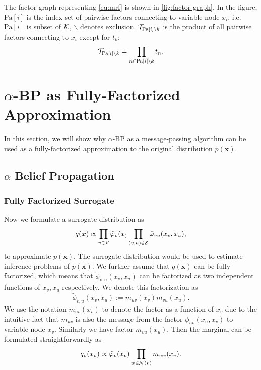 \documentclass[conference,onecolumn]{IEEEtran}
\begin{document}
The factor graph representing \autoref{eq:mrf} is shown in \autoref{fig:factor-graph}. In the figure, $\text{Pa}[i]$ is the index set of pairwise factors connecting to variable node $x_i$, i.e. $\text{Pa}[i]$ is subset of $\mathcal{K}$, $\backslash$ denotes exclusion. $\mathcal{T}_{\text{Pa}[i]\backslash k}$ is the product of all pairwise factors connecting to $x_i$ except for $t_k$:
\begin{equation}
  \mathcal{T}_{\text{Pa}[i]\backslash k} = \prod_{n \in \text{Pa}[i]\backslash k}t_n.
\end{equation}




\section{$\alpha$-BP as Fully-Factorized Approximation}
In this section, we will show why $\alpha$-BP as a message-passing algorithm can be used as a fully-factorized approximation to the original distribution $p(\bm{x})$. 




\subsection{$\alpha$ Belief Propagation}
\subsubsection{Fully Factorized Surrogate}
Now we formulate a surrogate distribution as
\begin{equation}
    q(\bm{x}) \propto \prod_{{v\in \mathcal{V}}} \tilde{\varphi}_v(x_) \prod_{(v,u) \in \mathcal{E}} \tilde{\varphi}_{vu}(x_v, x_u),
\end{equation}
to approximate $p(\bm{x})$. The surrogate distribution would be used to estimate inference problems of $p(\bm{x})$. We further assume that $q(\bm{x})$ can be fully factorized, which means that $\tilde{\phi}_{v,u}(x_v, x_u)$ can be factorized as two independent functions of $x_v, x_u$ respectively. We denote this factorization as
\begin{equation}
  \tilde{\phi}_{v,u}(x_v, x_u) := m_{uv}(x_v) m_{vu}(x_u).
\end{equation}
We use the notation $m_{uv}(x_v)$ to denote the factor as a function of $x_v$ due to the intuitive fact that $m_{uv}$ is also the message from the factor $\phi_{uv}(x_u, x_v)$ to variable node $x_v$. Similarly we have factor $m_{vu}(x_u)$. Then the marginal can be formulated straightforwardly as
\begin{equation}
  q_v(x_v) \propto \tilde{\varphi}_v(x_v) \prod_{w\in \mathcal{N}(v)} m_{wv}(x_v).
\end{equation}
\end{document}
